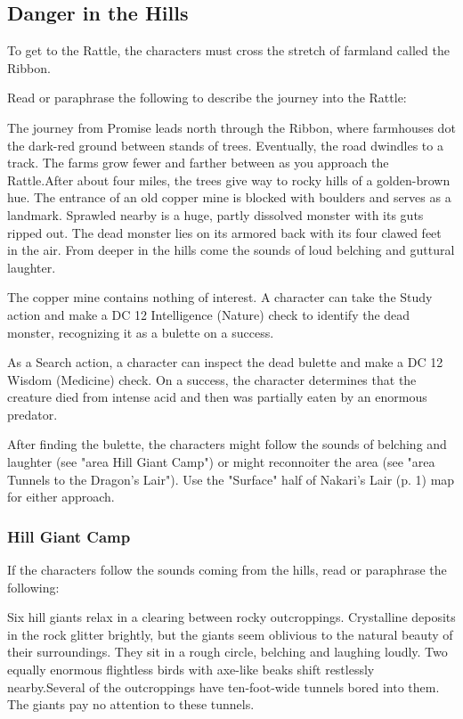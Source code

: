 \documentclass[letterpaper, 11pt, twocolumn]{dndbook}
\begin{document}
\subsection{Danger in the Hills}


To get to the Rattle, the characters must cross the stretch of farmland called the Ribbon.

Read or paraphrase the following to describe the journey into the Rattle:

\begin{DndReadAloud}
The journey from Promise leads north through the Ribbon, where farmhouses dot the dark-red ground between stands of trees. Eventually, the road dwindles to a track. The farms grow fewer and farther between as you approach the Rattle.After about four miles, the trees give way to rocky hills of a golden-brown hue. The entrance of an old copper mine is blocked with boulders and serves as a landmark. Sprawled nearby is a huge, partly dissolved monster with its guts ripped out. The dead monster lies on its armored back with its four clawed feet in the air. From deeper in the hills come the sounds of loud belching and guttural laughter.
\end{DndReadAloud}

The copper mine contains nothing of interest. A character can take the Study action and make a DC 12 Intelligence (Nature) check to identify the dead monster, recognizing it as a bulette on a success.

As a Search action, a character can inspect the dead bulette and make a DC 12 Wisdom (Medicine) check. On a success, the character determines that the creature died from intense acid and then was partially eaten by an enormous predator.

After finding the bulette, the characters might follow the sounds of belching and laughter (see "area Hill Giant Camp") or might reconnoiter the area (see "area Tunnels to the Dragon's Lair"). Use the "Surface" half of Nakari's Lair (p. 1) map for either approach.

\subsubsection{Hill Giant Camp}

If the characters follow the sounds coming from the hills, read or paraphrase the following:

\begin{DndReadAloud}
Six hill giants relax in a clearing between rocky outcroppings. Crystalline deposits in the rock glitter brightly, but the giants seem oblivious to the natural beauty of their surroundings. They sit in a rough circle, belching and laughing loudly. Two equally enormous flightless birds with axe-like beaks shift restlessly nearby.Several of the outcroppings have ten-foot-wide tunnels bored into them. The giants pay no attention to these tunnels.
\end{DndReadAloud}
\end{document}
